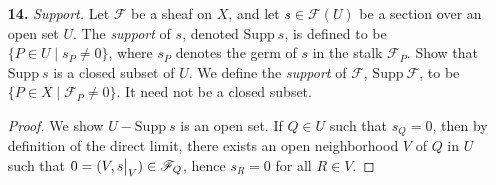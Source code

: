 \documentclass{article}
\newcommand{\fF}{\mathscr{F}}
\newcommand{\fG}{\mathscr{G}}
\newcommand\restr[2]{{%
  \left.\kern-\nulldelimiterspace %
  #1 %
  \vphantom{\big|} %
  \right|_{#2} %
}}
\begin{document}
\begin{enumerate} [label=\textbf{\arabic*.}, leftmargin=0em]
\begin{proof}
    Let $\fF$ be the presheaf $U \mapsto \varprojlim \fF_i(U)$. We have morphisms $\pi_{ij} : \fF_i \to \fF_j$ and $\pi_i : \fF \to \fF_i$ such that for all $i, j$, $\pi_j = \pi_{ij} \circ \pi_i$. If $U$ is an open set, if $\{V_\alpha \}$ is an open covering of $U$, then we have the exact sequence of abelian groups
    \[ \begin{tikzcd}
        0 \arrow[r] & {\Gamma(U, \fF_i)} \arrow[r] & {\prod_\alpha \Gamma(V_\alpha, \fF_i)} \arrow[r] & {\prod_{\alpha, \beta} \Gamma(V_\alpha \cap V_\beta, \fF_i)}
        \end{tikzcd} \]
    and direct limits commute with direct products, so the fact that $\fF$ is a sheaf follows from the exact sequence
    \[ \begin{tikzcd}
        0 \arrow[r] & {\varprojlim \Gamma(U, \fF_i)} \arrow[r] & {\prod_\alpha \varprojlim \Gamma(V_\alpha, \fF_i)} \arrow[r] & {\prod_{\alpha, \beta} \varprojlim \Gamma(V_\alpha \cap V_\beta, \fF_i)}.
        \end{tikzcd} \]
    To show $\fF$ is an inverse limit in a category-theoretic sense, if $\fG$ is some sheaf on $X$ with a collection of morphisms $\tau_i : \fG \to \fF_i$ such that $\tau_j = \pi_{ij} \circ \tau_i$ for all $i, j$, then we want to show there exists a unique $\theta : \fG \to \fF$ such that $\tau_i = \pi_i \circ \theta$. Since for each open subset $U$ in $X$ we have a direct system $\tau_i(U) : \Gamma(U, \fG) \to \Gamma(U, \fF_i)$, by the universal property of the inverse limit $\Gamma(U, \fF) = \varprojlim \Gamma(U, \fF_i)$, there exists a unique morphism $\theta(U) : \Gamma(U, \fG) \to \varprojlim \Gamma(U, \fF_i)$ such that $\tau_i(U) = \pi_i(U) \circ \theta(U)$, so we can define $\theta$ as such, then it is unique by construction.
\end{proof}

\item[\textbf{14.}] \textit{Support.} Let $\fF$ be a sheaf on $X$, and let $s \in \fF(U)$ be a section over an open set $U$. The \textit{support} of $s$, denoted $\text{Supp}~s$, is defined to be $\{ P \in U \mid s_P \neq 0 \}$, where $s_P$ denotes the germ of $s$ in the stalk $\fF_P$. Show that $\text{Supp}~s$ is a closed subset of $U$. We define the \textit{support} of $\fF$, $\text{Supp}~\fF$, to be $\{P \in X \mid \fF_P \neq 0 \}$. It need not be a closed subset.

\begin{proof}
    We show $U - \text{Supp}~s$ is an open set. If $Q \in U$ such that $s_Q = 0$, then by definition of the direct limit, there exists an open neighborhood $V$ of $Q$ in $U$ such that $0 = (V, \restr{s}{V}) \in \fF_Q$, hence $s_R = 0$ for all $R \in V$.
\end{proof}


\end{enumerate}
\end{document}
